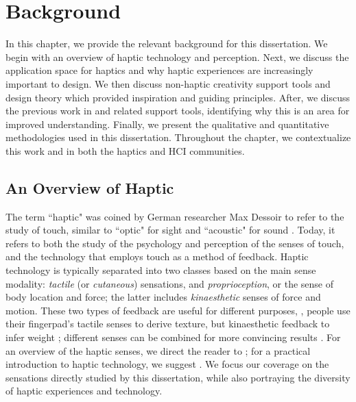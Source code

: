 
\chapter{Background}
\label{ch:rw}

In this chapter, we provide the relevant background for this dissertation.
We begin with an overview of haptic technology and perception.
Next, we discuss the application space for haptics and why haptic experiences are increasingly important to design.
We then discuss non-haptic creativity support tools and design theory which provided inspiration and guiding principles.
After, we discuss the previous work in \haxd and related support tools, identifying why this is an area for improved understanding.
Finally, we present the qualitative and quantitative methodologies used in this dissertation.
Throughout the chapter, we contextualize this work and \haxd in both the haptics and HCI communities.


%
%
\section{An Overview of Haptic}
The term ``haptic" was coined by German researcher Max Dessoir to refer to the study of touch, similar to ``optic" for sight and ``acoustic" for sound \cite{Grunwald2008}.
Today, it refers to both the study of the psychology and perception of the senses of touch, and the technology that employs touch as a method of feedback.
Haptic technology is typically separated into two classes based on the main sense modality: \emph{tactile} (or \emph{cutaneous}) sensations, and \emph{proprioception}, or the sense of body location and force;  the latter includes \emph{kinaesthetic} senses of force and motion.
These two types of feedback are useful for different purposes, \eg, people use their fingerpad's tactile senses to derive texture, but kinaesthetic feedback to infer weight \cite{Lederman1987};
different senses can be combined for more convincing results \cite{Okamura1998}.
For an overview of the haptic senses, we direct the reader to \citet{Lederman2009survey}; for a practical introduction to haptic technology, we suggest \citet{Hayward2007}.
We focus our coverage on the sensations directly studied by this dissertation, while also portraying the diversity of haptic experiences and technology.

